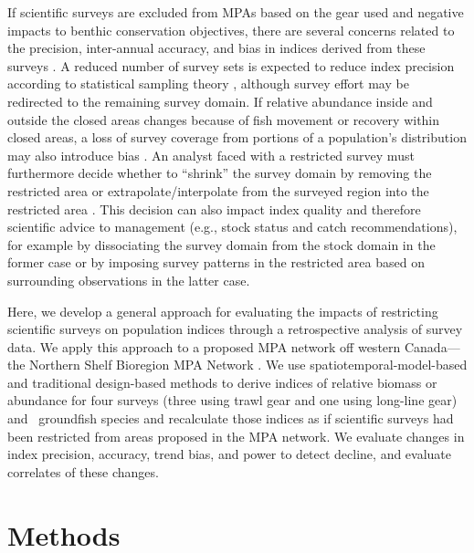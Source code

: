 \documentclass[12pt]{article}
\newcommand{\R}[1]{\label{#1}\linelabel{#1}}
\begin{document}
\begin{spacing}{1.4}
If scientific surveys are excluded from MPAs based on the gear used and negative impacts to benthic conservation objectives, there are several concerns related to the precision, inter-annual accuracy, and bias in indices derived from these surveys \citep{field2006, rideout2017, saarman2018, benoit2020national, benoit2020gulf, ices2020, ices2023}.
A reduced number of survey sets is expected to reduce index precision according to statistical sampling theory \citep{cochran1977}, although survey effort may be redirected to the remaining survey domain.
If relative abundance inside and outside the closed areas changes because of fish movement or recovery within closed areas, a loss of survey coverage from portions of a population's distribution may also introduce bias \citep[][]{benoit2020national}.
An analyst faced with a restricted survey must furthermore decide whether to ``shrink'' the survey domain by removing the restricted area \citep{rideout2017, benoit2020national} or extrapolate/interpolate from the surveyed region into the restricted area \citep{benoit2020national}.
\R{A2}This decision can also impact index quality and therefore scientific advice to management (e.g., stock status and catch recommendations), for example by dissociating the survey domain from the stock domain in the former case or by imposing survey patterns in the restricted area based on surrounding observations in the latter case.

Here, we develop a general approach for evaluating the impacts of restricting scientific surveys on population indices through a retrospective analysis of survey data.
We apply this approach to a proposed MPA network off western Canada---the Northern Shelf Bioregion MPA Network \citep[][Fig.~\ref{fig:map}]{dfo2022networkactionplan}.
We use spatiotemporal-model-based and traditional design-based methods to derive indices of relative biomass or abundance for four surveys (three using trawl gear and one using long-line gear) and \nSpp\ groundfish species and recalculate those indices as if scientific surveys had been restricted from areas proposed in the MPA network.
We evaluate changes in index precision, accuracy, trend bias, and power to detect decline, and evaluate correlates of these changes.

\section*{Methods}


\end{spacing}
\end{document}
